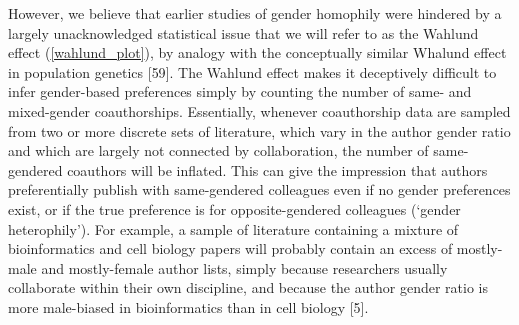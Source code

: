 \documentclass[12pt,]{article}
\begin{document}
However, we believe that earlier studies of gender homophily were
hindered by a largely unacknowledged statistical issue that we will
refer to as the Wahlund effect (\autoref{wahlund_plot}), by analogy with
the conceptually similar Whalund effect in population genetics {[}59{]}.
The Wahlund effect makes it deceptively difficult to infer gender-based
preferences simply by counting the number of same- and mixed-gender
coauthorships. Essentially, whenever coauthorship data are sampled from
two or more discrete sets of literature, which vary in the author gender
ratio and which are largely not connected by collaboration, the number
of same-gendered coauthors will be inflated. This can give the
impression that authors preferentially publish with same-gendered
colleagues even if no gender preferences exist, or if the true
preference is for opposite-gendered colleagues (`gender heterophily').
For example, a sample of literature containing a mixture of
bioinformatics and cell biology papers will probably contain an excess
of mostly-male and mostly-female author lists, simply because
researchers usually collaborate within their own discipline, and because
the author gender ratio is more male-biased in bioinformatics than in
cell biology {[}5{]}.
\end{document}
